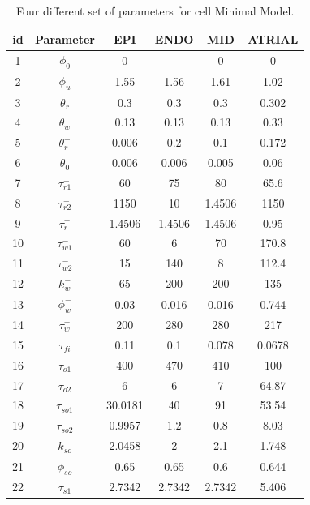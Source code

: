 \begin{table}[H]
	\centering
	\caption{Four different set of parameters for cell Minimal Model.}
	\label{tab:parametros_minimal}
	\begin{tabular}{@{}cccccc@{}}
		\toprule
		id & Parameter     & EPI    & ENDO   & MID    & ATRIAL \\ \midrule
		1  & $\phi_0$      & 0      &        & 0      & 0      \\
		2  & $\phi_u$      & 1.55   & 1.56   & 1.61   & 1.02   \\
		3  & $\theta_r$    & 0.3    & 0.3    & 0.3    & 0.302  \\
		4  & $\theta_w$    & 0.13   & 0.13   & 0.13   & 0.33   \\
		5  & $\theta_r^-$  & 0.006  & 0.2    & 0.1    & 0.172  \\
		6  & $\theta_0$    & 0.006  & 0.006  & 0.005  & 0.06   \\
		7  & $\tau_{r1}^-$ & 60     & 75     & 80     & 65.6   \\
		8  & $\tau_{r2}^-$ & 1150   & 10     & 1.4506 & 1150   \\
		9  & $\tau_r^+$    & 1.4506 & 1.4506 & 1.4506 & 0.95   \\
		10 & $\tau_{w1}^-$ & 60     & 6      & 70     & 170.8  \\
		11 & $\tau_{w2}^-$ & 15     & 140    & 8      & 112.4  \\
		12 & $k_w^-$       & 65     & 200    & 200    & 135    \\
		13 & $\phi_w^-$    & 0.03   & 0.016  & 0.016  & 0.744  \\
		14 & $\tau_w^+$    & 200    & 280    & 280    & 217    \\
		15 & $\tau_{fi}$   & 0.11   & 0.1    & 0.078  & 0.0678 \\ 
		16 & $\tau_{o1}$       & 400     & 470    & 410 & 100   \\
		17 & $\tau_{o2}$       & 6       & 6      & 7 & 64.87     \\
		18 & $\tau_{so1}$      & 30.0181 & 40     & 91 & 53.54    \\
		19 & $\tau_{so2}$      & 0.9957  & 1.2    & 0.8 & 8.03   \\
		20 & $k_{so}$          & 2.0458  & 2      & 2.1 & 1.748   \\
		21 & $\phi_{so}$       & 0.65    & 0.65   & 0.6 & 0.644   \\
		22 & $\tau_{s1}$       & 2.7342  & 2.7342 & 2.7342 & 5.406 \\

\end{tabular}
\end{table}
